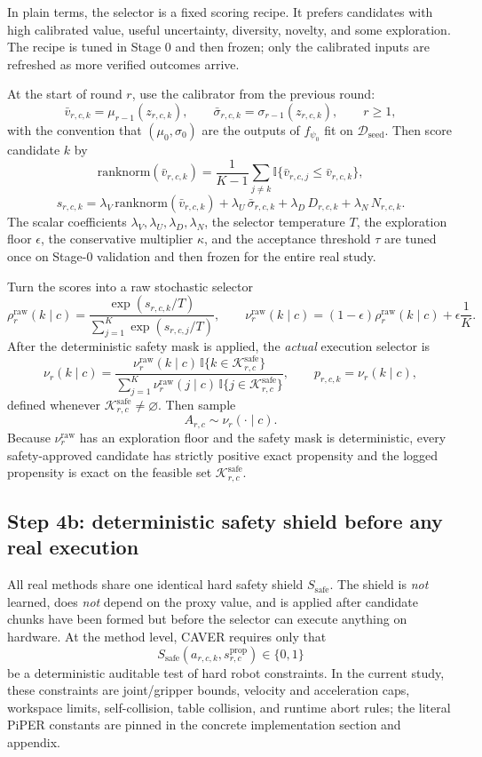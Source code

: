 \documentclass[10pt]{article}
\theoremstyle{plain}
\theoremstyle{definition}
\theoremstyle{remark}
\newcommand{\I}{\mathbb{I}}
\begin{document}
In plain terms, the selector is a fixed scoring recipe. It prefers candidates with high calibrated value, useful uncertainty, diversity, novelty, and some exploration. The recipe is tuned in Stage 0 and then frozen; only the calibrated inputs are refreshed as more verified outcomes arrive.

At the start of round $r$, use the calibrator from the previous round:
\[
\bar v_{r,c,k}=\mu_{r-1}(z_{r,c,k}),
\qquad
\bar\sigma_{r,c,k}=\sigma_{r-1}(z_{r,c,k}),
\qquad r\ge 1,
\]
with the convention that $(\mu_0,\sigma_0)$ are the outputs of $f_{\psi_0}$ fit on $\mathcal D_{\mathrm{seed}}$. Then score candidate $k$ by
\[
\mathrm{ranknorm}(\bar v_{r,c,k}) = \frac{1}{K-1}\sum_{j\neq k}\I\{\bar v_{r,c,j}\le \bar v_{r,c,k}\},
\]
\[
s_{r,c,k}=\lambda_V\,\mathrm{ranknorm}(\bar v_{r,c,k})+\lambda_U\,\bar\sigma_{r,c,k}+\lambda_D\,D_{r,c,k}+\lambda_N\,N_{r,c,k}.
\]
The scalar coefficients $\lambda_V,\lambda_U,\lambda_D,\lambda_N$, the selector temperature $T$, the exploration floor $\epsilon$, the conservative multiplier $\kappa$, and the acceptance threshold $\tau$ are tuned once on Stage-0 validation and then frozen for the entire real study.

Turn the scores into a raw stochastic selector
\[
\rho_r^{\mathrm{raw}}(k\mid c)=\frac{\exp(s_{r,c,k}/T)}{\sum_{j=1}^{K}\exp(s_{r,c,j}/T)},
\qquad
\nu_r^{\mathrm{raw}}(k\mid c)=(1-\epsilon)\rho_r^{\mathrm{raw}}(k\mid c)+\epsilon\frac{1}{K}.
\]
After the deterministic safety mask is applied, the \emph{actual} execution selector is
\[
\nu_r(k\mid c)=
\frac{\nu_r^{\mathrm{raw}}(k\mid c)\,\I\{k\in\mathcal K^{\mathrm{safe}}_{r,c}\}}
{\sum_{j=1}^{K}\nu_r^{\mathrm{raw}}(j\mid c)\,\I\{j\in\mathcal K^{\mathrm{safe}}_{r,c}\}},
\qquad
p_{r,c,k}=\nu_r(k\mid c),
\]
defined whenever $\mathcal K^{\mathrm{safe}}_{r,c}\neq\varnothing$. Then sample
\[
A_{r,c}\sim \nu_r(\cdot\mid c).
\]
Because $\nu_r^{\mathrm{raw}}$ has an exploration floor and the safety mask is deterministic, every safety-approved candidate has strictly positive exact propensity and the logged propensity is exact on the feasible set $\mathcal K^{\mathrm{safe}}_{r,c}$.

\subsection{Step 4b: deterministic safety shield before any real execution}
All real methods share one identical hard safety shield $S_{\mathrm{safe}}$. The shield is \emph{not} learned, does \emph{not} depend on the proxy value, and is applied after candidate chunks have been formed but before the selector can execute anything on hardware. At the method level, CAVER requires only that
\[
S_{\mathrm{safe}}(a_{r,c,k},s^{\mathrm{prop}}_{r,c})\in\{0,1\}
\]
be a deterministic auditable test of hard robot constraints. In the current study, these constraints are joint/gripper bounds, velocity and acceleration caps, workspace limits, self-collision, table collision, and runtime abort rules; the literal PiPER constants are pinned in the concrete implementation section and appendix.
\end{document}
